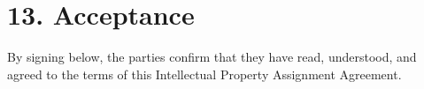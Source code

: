 \documentclass{paridyum}
\begin{document}
\section*{13. Acceptance}
By signing below, the parties confirm that they have read, understood, and agreed to
the terms of this Intellectual Property Assignment Agreement.

\vspace{1.5em}
\paridyumofficers{\dkSigCeoName}{\dkSigCeoDesignation}{\dkSigCtoName}{\dkSigCtoDesignation}

\vspace{1.5em}
\end{document}
